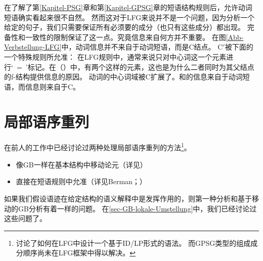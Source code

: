 \noindent
在了解了第\ref{Kapitel-PSG}章和第\ref{Kapitel-GPSG}章的短语结构规则后，允许动词短语确实看起来很不自然。
然而这对于LFG来说并不是一个问题，因为分析一个给定的句子，我们只需要保证所有必须要的成分（也只有这些成分）都出现。 
完备性和一致性的限制保证了这一点。究竟信息来自何方并不重要。
在图\ref{Abb-Verbstellung-LFG}中，动词信息并不来自于动词短语，而是C结点。
C$'$被下面的一个特殊规则所允准：
\ea
{}
\z
在LFG规则中，通常来说只对中心词这一个元素进行`\up~=~\down'标记。在（）中，有两个这样的元素，这也是为什么二者同时为其父结点的f-结构提供信息的原因。
动词的中心词域被C扩展了。\lfgsubj 和\lfgobj 的信息来自于动词短语，而\pred 信息则来自于C。 

\section{局部语序重列}
\label{Abschnitt-LFG-Umstellung}

在前人的工作中已经讨论过两种处理局部语序重列的方法\footnote{%
   \citet[--21]{Kaplan95a}讨论了如何在LFG中设计一个基于ID/LP形式的语法。
  而GPSG类型的组成成分顺序尚未在LFG框架中得以解决。%
}。
\begin{itemize}
\item 像GB\indexgbc 一样在基本结构中移动论元（详见\citealp{Choi99a-u}）
\item 直接在短语规则中允准（详见Berman\citeyear[\S~2.1.3.1]{Berman96a-u}；\citeyear{Berman2003a}）
\end{itemize}

\noindent
如果我们假设语迹在给定结构的语义解释中是发挥作用的，则第一种分析和基于移动的GB分析有着一样的问题。
在\ref{sec-GB-lokale-Umstellung}中，我们已经讨论过这些问题了。

